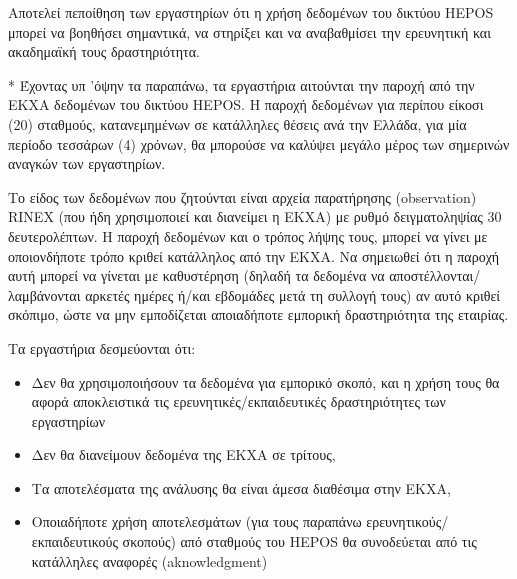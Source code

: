 \documentclass[11pt]{article}
\begin{document}
Αποτελεί πεποίθηση των εργαστηρίων ότι η χρήση δεδομένων του δικτύου HEPOS μπορεί να βοηθήσει σημαντικά, να στηρίξει και να αναβαθμίσει την ερευνητική και ακαδημαϊκή τους δραστηριότητα.

\vspace{0.5cm}
*%
Έχοντας υπ 'όψην τα παραπάνω, τα εργαστήρια αιτούνται την παροχή από την ΕΚΧΑ δεδομένων του δικτύου HEPOS. Η παροχή δεδομένων για περίπου είκοσι (20) σταθμούς, κατανεμημένων σε κατάλληλες θέσεις ανά την Ελλάδα, για μία περίοδο τεσσάρων (4) χρόνων, θα μπορούσε να καλύψει μεγάλο μέρος των σημερινών αναγκών των εργαστηρίων.

Το είδος των δεδομένων που ζητούνται είναι αρχεία παρατήρησης (observation) RINEX (που ήδη χρησιμοποιεί και διανείμει η ΕΚΧΑ) με ρυθμό δειγματοληψίας 30 δευτερολέπτων. Η παροχή δεδομένων και ο τρόπος λήψης τους, μπορεί να γίνει με οποιονδήποτε τρόπο κριθεί κατάλληλος από την ΕΚΧΑ. Να σημειωθεί ότι η παροχή αυτή μπορεί να γίνεται με καθυστέρηση (δηλαδή τα δεδομένα να αποστέλλονται/λαμβάνονται αρκετές ημέρες ή/και εβδομάδες μετά τη συλλογή τους) αν αυτό κριθεί σκόπιμο, ώστε να μην εμποδίζεται αποιαδήποτε εμπορική δραστηριότητα της εταιρίας.

Τα εργαστήρια δεσμεύονται ότι:
\begin{itemize}
\item Δεν θα χρησιμοποιήσουν τα δεδομένα για εμπορικό σκοπό, και η χρήση τους θα αφορά αποκλειστικά τις ερευνητικές/εκπαιδευτικές δραστηριότητες των εργαστηρίων
\item Δεν θα διανείμουν δεδομένα της ΕΚΧΑ σε τρίτους,
\item Τα αποτελέσματα της ανάλυσης θα είναι άμεσα διαθέσιμα στην ΕΚΧΑ,
\item Οποιαδήποτε χρήση αποτελεσμάτων (για τους παραπάνω ερευνητικούς/εκπαιδευτικούς σκοπούς) από σταθμούς του HEPOS θα συνοδεύεται από τις κατάλληλες αναφορές (aknowledgment)
\end{itemize}
\end{document}
